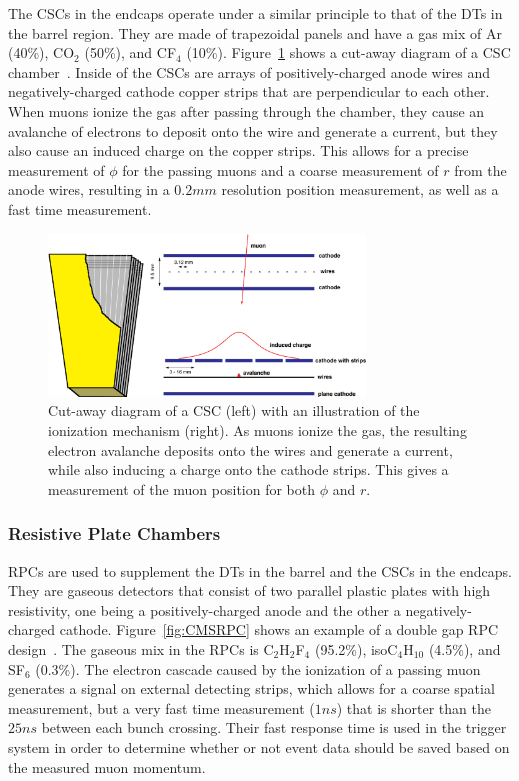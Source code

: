 The CSCs in the endcaps operate under a similar principle to that of the DTs in the barrel region.
They are made of trapezoidal panels and have a gas mix of Ar (40\%), CO$_2$ (50\%), and CF$_4$ (10\%).
Figure~\ref{fig:CMSCSC} shows a cut-away diagram of a CSC chamber~\cite{collaboration_2013}.
Inside of the CSCs are arrays of positively-charged anode wires and negatively-charged cathode copper strips that are perpendicular to each other.
When muons ionize the gas after passing through the chamber, they cause an avalanche of electrons to deposit onto the wire and generate a current, but they also cause an induced charge on the copper strips.
This allows for a precise measurement of $\phi$ for the passing muons and a coarse measurement of $r$ from the anode wires, resulting in a $0.2\unit{mm}$ resolution position measurement, as well as a fast time measurement.

\begin{figure}[htbp]
  \centering
  \includegraphics[width=0.75\textwidth]{fig/experiment/cms_csc.pdf}
  \caption{
    Cut-away diagram of a CSC (left) with an illustration of the ionization mechanism (right).
    As muons ionize the gas, the resulting electron avalanche deposits onto the wires and generate a current, while also inducing a charge onto the cathode strips.
    This gives a measurement of the muon position for both $\phi$ and $r$.
  }
  \label{fig:CMSCSC}
\end{figure}

\subsubsection{Resistive Plate Chambers}

RPCs are used to supplement the DTs in the barrel and the CSCs in the endcaps.
They are gaseous detectors that consist of two parallel plastic plates with high resistivity, one being a positively-charged anode and the other a negatively-charged cathode.
Figure~\ref{fig:CMSRPC} shows an example of a double gap RPC design~\cite{kumari2020improvedrpc}.
The gaseous mix in the RPCs is C$_2$H$_2$F$_4$ (95.2\%), isoC$_4$H$_{10}$ (4.5\%), and SF$_6$ (0.3\%).
The electron cascade caused by the ionization of a passing muon generates a signal on external detecting strips, which allows for a coarse spatial measurement, but a very fast time measurement ($1\unit{ns}$) that is shorter than the $25\unit{ns}$ between each bunch crossing.
Their fast response time is used in the trigger system in order to determine whether or not event data should be saved based on the measured muon momentum.

